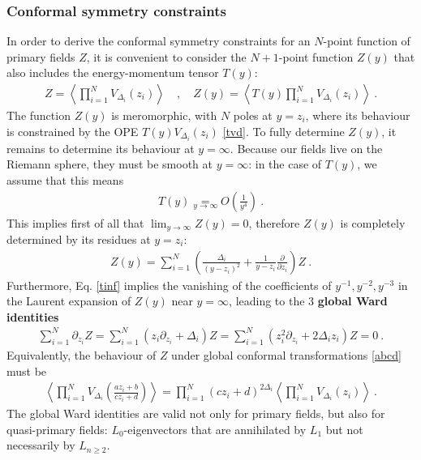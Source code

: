 \documentclass[12pt, a4paper]{article}
\newcommand{\myindex}[1]{\textbf{\boldmath #1}}
\theoremstyle{break}
\begin{document}
\subsubsection{Conformal symmetry constraints}\label{sec:csc}

In order to derive the conformal symmetry constraints for an $N$-point function of primary fields $Z$, it is convenient to consider the $N+1$-point function $Z(y)$ that also includes the energy-momentum tensor $T(y)$:
\begin{align}
 Z = \left< \prod_{i=1}^N V_{\Delta_i}(z_i)\right> \quad , \quad Z(y) = \left< T(y)\prod_{i=1}^N V_{\Delta_i}(z_i)\right>\ .
\end{align}
The function $Z(y)$ is meromorphic, with $N$ poles at $y=z_i$, where its behaviour is constrained by the OPE $T(y)V_{\Delta_i}(z_i)$ \eqref{tvd}. To fully determine $Z(y)$, it remains to determine its behaviour at $y=\infty$. Because our fields live on the Riemann sphere, they must be smooth at $y=\infty$: in the case of $T(y)$, we assume that this means 
\begin{align}
 T(y) \underset{y\to\infty} = O\left(\frac{1}{y^4}\right)\ .
 \label{tinf}
\end{align}
This implies first of all that $\lim_{y\to \infty} Z(y)=0$, therefore $Z(y)$ is completely determined by its residues at $y=z_i$:
\begin{align}
 Z(y) = \sum_{i=1}^N \left(\frac{\Delta_i}{(y-z_i)^2} +\frac{1}{y-z_i}\frac{\partial}{\partial z_i}\right) Z\ .
 \label{zy}
\end{align}
Furthermore, Eq. \eqref{tinf} implies the vanishing of the coefficients of $y^{-1},y^{-2},y^{-3}$ in the Laurent expansion of $Z(y)$ near $y=\infty$, leading to the 3 \myindex{global Ward identities} 
\begin{align}
 \sum_{i=1}^N \partial_{z_i} Z = \sum_{i=1}^N \left(z_i \partial_{z_i} + \Delta_i\right) Z = \sum_{i=1}^N \left(z_i^2 \partial_{z_i} + 2\Delta_iz_i\right) Z = 0\ .
 \label{gward}
\end{align}
Equivalently, the behaviour of $Z$ under global conformal transformations \eqref{abcd} must be
\begin{align}
 \boxed{\left< \prod_{i=1}^N  V_{\Delta_i}\left(\frac{az_i+b}{cz_i+d}\right) \right>
 = \prod_{i=1}^N (cz_i +d)^{2\Delta_i} \left< \prod_{i=1}^N V_{\Delta_i}(z_i) \right>}\ .
 \label{zgc}
\end{align}
The global Ward identities are valid not only for primary fields, but also for quasi-primary fields: $L_0$-eigenvectors that are annihilated by $L_1$ but not necessarily by $L_{n\geq 2}$. 
\end{document}
